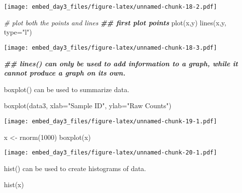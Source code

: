 \documentclass[
]{article}
\newenvironment{Shaded}{\begin{snugshade}}{\end{snugshade}}
\newcommand{\AttributeTok}[1]{\textcolor[rgb]{0.77,0.63,0.00}{#1}}
\newcommand{\CommentTok}[1]{\textcolor[rgb]{0.56,0.35,0.01}{\textit{#1}}}
\newcommand{\DecValTok}[1]{\textcolor[rgb]{0.00,0.00,0.81}{#1}}
\newcommand{\DocumentationTok}[1]{\textcolor[rgb]{0.56,0.35,0.01}{\textbf{\textit{#1}}}}
\newcommand{\FunctionTok}[1]{\textcolor[rgb]{0.00,0.00,0.00}{#1}}
\newcommand{\NormalTok}[1]{#1}
\newcommand{\OtherTok}[1]{\textcolor[rgb]{0.56,0.35,0.01}{#1}}
\newcommand{\StringTok}[1]{\textcolor[rgb]{0.31,0.60,0.02}{#1}}
\begin{document}
\texttt{[image: embed\_day3\_files/figure-latex/unnamed-chunk-18-2.pdf]}

\begin{Shaded}
\begin{Highlighting}[]
\CommentTok{\# plot both the points and lines}
\DocumentationTok{\#\# first plot points}
\FunctionTok{plot}\NormalTok{(x,y)}
\FunctionTok{lines}\NormalTok{(x,y, }\AttributeTok{type=}\StringTok{"l"}\NormalTok{)}
\end{Highlighting}
\end{Shaded}

\texttt{[image: embed\_day3\_files/figure-latex/unnamed-chunk-18-3.pdf]}

\begin{Shaded}
\begin{Highlighting}[]
\DocumentationTok{\#\# lines() can only be used to add information to a graph, while it cannot produce a graph on its own.}
\end{Highlighting}
\end{Shaded}

boxplot() can be used to summarize data.

\begin{Shaded}
\begin{Highlighting}[]
\FunctionTok{boxplot}\NormalTok{(data3, }\AttributeTok{xlab=}\StringTok{"Sample ID"}\NormalTok{, }\AttributeTok{ylab=}\StringTok{"Raw Counts"}\NormalTok{)}
\end{Highlighting}
\end{Shaded}

\texttt{[image: embed\_day3\_files/figure-latex/unnamed-chunk-19-1.pdf]}

\begin{Shaded}
\begin{Highlighting}[]
\NormalTok{x }\OtherTok{\textless{}{-}} \FunctionTok{rnorm}\NormalTok{(}\DecValTok{1000}\NormalTok{)}
\FunctionTok{boxplot}\NormalTok{(x)}
\end{Highlighting}
\end{Shaded}

\texttt{[image: embed\_day3\_files/figure-latex/unnamed-chunk-20-1.pdf]}

hist() can be used to create histograms of data.

\begin{Shaded}
\begin{Highlighting}[]
\FunctionTok{hist}\NormalTok{(x)}
\end{Highlighting}
\end{Shaded}
\end{document}
